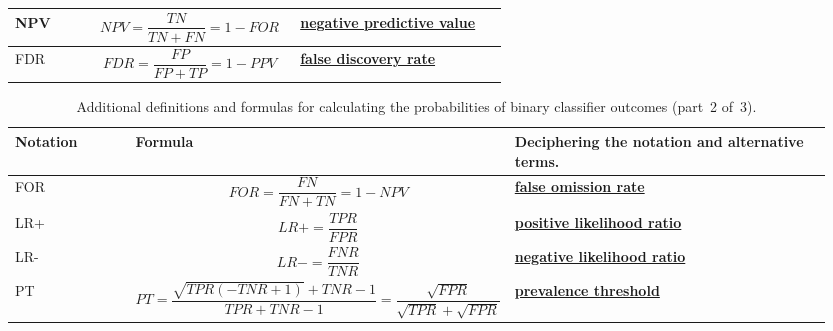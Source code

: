 \documentclass[]{scrreprt}
\begin{document}
\begin{table}[ht]
\begin{tabularx}{\textwidth}{p{0.15\linewidth} p{0.4\linewidth} p{0.4\linewidth}}
		\hline
		NPV&\begin{equation}\label{eq:NPV}
		NPV = \frac{TN}{TN+FN} = 1 -FOR
		\end{equation}&\href{https://en.wikipedia.org/wiki/Positive_and_negative_predictive_values}{\textbf{negative predictive value}}~\cite{Wiki:PPV}\\
		\hline
		FDR&\begin{equation}\label{eq:FDR}
		FDR = \frac{FP}{FP + TP} = 1 - PPV
		\end{equation}&\href{https://en.wikipedia.org/wiki/False_discovery_rate}{\textbf{false discovery rate}}~\cite{Wiki:FDR}\\
		\hline
	\end{tabularx}
	\normalsize
\end{table}
%
\begin{table}[ht]
	\caption{Additional definitions and formulas for calculating the probabilities of binary classifier outcomes (part~2 of~3).}\label{tab:ROC-rates-2}
	\tiny
	\begin{tabularx}{\textwidth}{p{0.15\linewidth} p{0.4\linewidth} p{0.4\linewidth}} 
		\hline
		Notation&Formula&Deciphering the notation and alternative terms.\\
		\hline
		FOR&\begin{equation}\label{eq:FOR}
		FOR = \frac{FN}{FN+TN}=1-NPV
		\end{equation}&\href{https://en.wikipedia.org/wiki/Positive_and_negative_predictive_values}{\textbf{false omission rate}}~\cite{Wiki:PPV}\\
		\hline
		LR+&\begin{equation}\label{eq:LR+}
		LR+=\frac{TPR}{FPR}
		\end{equation}&\href{https://en.wikipedia.org/wiki/Likelihood_ratios_in_diagnostic_testing\#positive_likelihood_ratio}{\textbf{\textbf{positive likelihood ratio}}}~\cite{Wiki:likehoods-ratios}\\
		\hline
		LR-&\begin{equation}\label{eq:LR-}
		LR-=\frac{FNR}{TNR}
		\end{equation}&\href{https://en.wikipedia.org/wiki/Likelihood_ratios_in_diagnostic_testing\#negative_likelihood_ratio}{\textbf{negative likelihood ratio}}~\cite{Wiki:likehoods-ratios}\\
		\hline
		PT&\begin{equation}\label{eq:PT}
		PT=\frac{\sqrt{TPR(-TNR+1)}+TNR-1}{TPR+TNR-1}=\frac{\sqrt{FPR}}{\sqrt{TPR}+\sqrt{FPR}}
		\end{equation}&\href{https://en.wikipedia.org/wiki/Sensitivity_(test)}{\textbf{prevalence threshold}}~\cite{Wiki:sensitivity-and-specificity}\\

\end{tabularx}
\end{table}
\end{document}

